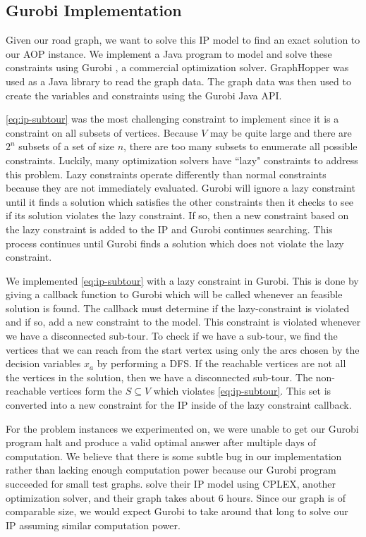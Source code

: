 \documentclass[honors]{union-cs-thesis}
\newcommand{\sse}{\subseteq} %
\begin{document}
\subsection{Gurobi Implementation}
Given our road graph, we want to solve this IP model to find an exact solution to our AOP instance. We implement a Java program to model and solve these constraints using Gurobi \cite{gurobi}, a commercial optimization solver. GraphHopper was used as a Java library to read the graph data. The graph data was then used to create the variables and constraints using the Gurobi Java API. 

\cref{eq:ip-subtour} was the most challenging constraint to implement since it is a constraint on all subsets of vertices. Because $V$ may be quite large and there are $2^n$ subsets of a set of size $n$, there are too many subsets to enumerate all possible constraints. Luckily, many optimization solvers have ``lazy" constraints to address this problem. Lazy constraints operate differently than normal constraints because they are not immediately evaluated. Gurobi will ignore a lazy constraint until it finds a solution which satisfies the other constraints then it checks to see if its solution violates the lazy constraint. If so, then a new constraint based on the lazy constraint is added to the IP and Gurobi continues searching. This process continues until Gurobi finds a solution which does not violate the lazy constraint.
 
We implemented \cref{eq:ip-subtour} with a lazy constraint in Gurobi. This is done by giving a callback function to Gurobi which will be called whenever an feasible solution is found. The callback must determine if the lazy-constraint is violated and if so, add a new constraint to the model. This constraint is violated whenever we have a disconnected sub-tour. To check if we have a sub-tour, we find the vertices that we can reach from the start vertex using only the arcs chosen by the decision variables $x_a$ by performing a DFS. If the reachable vertices are not all the vertices in the solution, then we have a disconnected sub-tour. The non-reachable vertices form the $S \sse V$ which violates \cref{eq:ip-subtour}. This set is converted into a new constraint for the IP inside of the lazy constraint callback.

For the problem instances we experimented on, we were unable to get our Gurobi program halt and produce a valid optimal answer after multiple days of computation. We believe that there is some subtle bug in our implementation rather than lacking enough computation power because our Gurobi program succeeded for small test graphs. \citeauthor{verbeeck2014extension} solve their IP model using CPLEX, another optimization solver, and their graph takes about 6 hours. Since our graph is of comparable size, we would expect Gurobi to take around that long to solve our IP assuming similar computation power.
\end{document}
